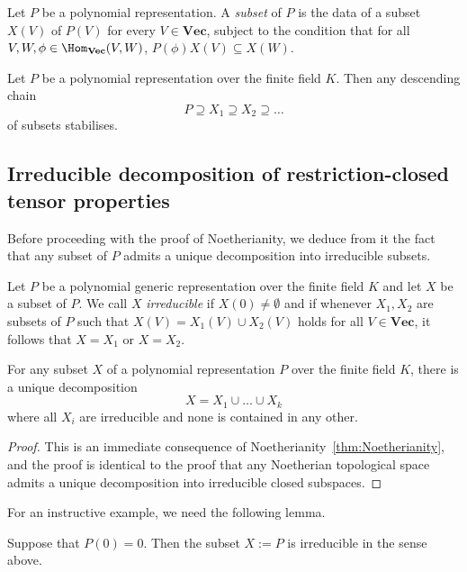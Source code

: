 \documentclass{amsart}
\renewcommand{\Vec}{\mathbf{Vec}}
\begin{document}
\begin{de} \label{de:Subset}
Let $P$ be a polynomial representation. A {\em subset} of $P$ is the data of a
subset $X(V)$ of $P(V)$ for every $V \in \Vec$, subject to the condition
that for all $V,W,\phi \in \Hom_\Vec(V,W)$, $P(\phi)X(V) \subseteq X(W)$.
\end{de}

\begin{thm}[Noetherianity] \label{thm:Noetherianity}
Let $P$ be a polynomial representation over the finite field $K$. Then
any descending chain
\[ P \supseteq X_1 \supseteq X_2 \supseteq \ldots \]
of subsets stabilises.
\end{thm}

\subsection{Irreducible decomposition of restriction-closed
tensor properties}

Before proceeding with the proof of Noetherianity, we deduce from it
the fact that any subset of $P$ admits a unique decomposition into
irreducible subsets.

\begin{de}
Let $P$ be a polynomial generic representation over the
finite field $K$ and let $X$ be a subset of $P$. We call $X$
{\em irreducible} if $X(0) \neq \emptyset$ and if whenever
$X_1,X_2$ are subsets of $P$ such that $X(V)=X_1(V) \cup
X_2(V)$ holds for all $V \in \Vec$, it follows that $X=X_1$ or $X=X_2$. 
\end{de}

\begin{thm} \label{thm:Irreducibility}
For any subset $X$ of a polynomial representation $P$ over
the finite field $K$, there is a unique decomposition 
\[ X=X_1 \cup \ldots \cup X_k \]
where all $X_i$ are irreducible and none is contained in any other.
\end{thm}

\begin{proof}
This is an immediate consequence of
Noetherianity~\ref{thm:Noetherianity}, and the proof is 
identical to the proof that any Noetherian topological space
admits a unique decomposition into irreducible closed subspaces.
\end{proof}

For an instructive example, we need the following lemma.

\begin{lm} \label{lm:Pure}
Suppose that $P(0)=0$. Then the subset $X:=P$ is irreducible in the sense
above. 
\end{lm}
\end{document}
